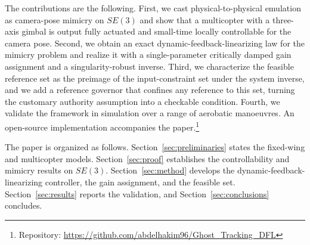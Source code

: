 The contributions are the following. First, we cast physical-to-physical emulation as camera-pose mimicry on $SE(3)$ and show that a multicopter with a three-axis gimbal is output fully actuated and small-time locally controllable for the camera pose. Second, we obtain an exact dynamic-feedback-linearizing law for the mimicry problem and realize it with a single-parameter critically damped gain assignment and a singularity-robust inverse. Third, we characterize the feasible reference set as the preimage of the input-constraint set under the system inverse, and we add a reference governor that confines any reference to this set, turning the customary authority assumption into a checkable condition. Fourth, we validate the framework in simulation over a range of aerobatic manoeuvres. An open-source implementation accompanies the paper.\footnote{Repository: \url{https://github.com/abdelhakim96/Ghost_Tracking_DFL}}

The paper is organized as follows. Section~\ref{sec:preliminaries} states the fixed-wing and multicopter models. Section~\ref{sec:proof} establishes the controllability and mimicry results on $SE(3)$. Section~\ref{sec:method} develops the dynamic-feedback-linearizing controller, the gain assignment, and the feasible set. Section~\ref{sec:results} reports the validation, and Section~\ref{sec:conclusions} concludes.